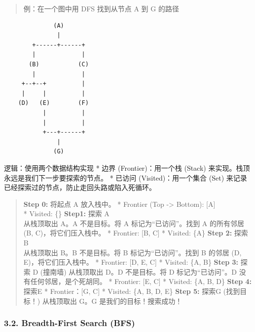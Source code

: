 \documentclass[11pt,a4paper]{article}
\begin{document}
\begin{quote}
例：在一个图中用 DFS 找到从节点 A 到 G 的路径
\end{quote}

\begin{verbatim}
              (A)
               |
        +------+------+
        |             |
       (B)           (C)
        |             |
     +--+--+          |
     |     |          |
    (D)   (E)        (F)
           |          |
           |          |
           +---+------+
               |
              (G)
\end{verbatim}

逻辑：使用两个数据结构实现 * 边界 (Frontier)：用一个栈 (Stack) 来实现。栈顶永远是我们下一步要探索的节点。 * 已访问 (Visited)：用一个集合 (Set) 来记录已经探索过的节点，防止走回头路或陷入死循环。

\begin{quote}
\textbf{Step 0:} 将起点 A 放入栈中。 * Frontier (Top -\textgreater{} Bottom): {[}A{]}\\
* Visited: \{\} \textbf{Step1:} 探索 A\\
从栈顶取出 A。A 不是目标。将 A 标记为``已访问''。找到 A 的所有邻居 (B, C)，将它们压入栈中。 * Frontier: {[}B, C{]} * Visited: \{A\} \textbf{Step 2:} 探索 B\\
从栈顶取出 B。B 不是目标。将 B 标记为``已访问''。找到 B 的邻居 (D, E)，将它们压入栈中。 * Frontier: {[}D, E, C{]} * Visited: \{A, B\} \textbf{Step 3:} 探索 D (撞南墙) 从栈顶取出 D。D 不是目标。将 D 标记为``已访问''。D 没有任何邻居，是个死胡同。 * Frontier: {[}E, C{]} * Visited: \{A, B, D\} \textbf{Step 4:} 探索E * Frontier：{[}G, C{]} * Visited: \{A, B, D, E\} \textbf{Step 5:} 探索G (找到目标！) 从栈顶取出 G。G 是我们的目标！搜索成功！
\end{quote}

\subsubsection{3.2. Breadth-First Search (BFS)}\label{breadth-first-search-bfs}
\end{document}

